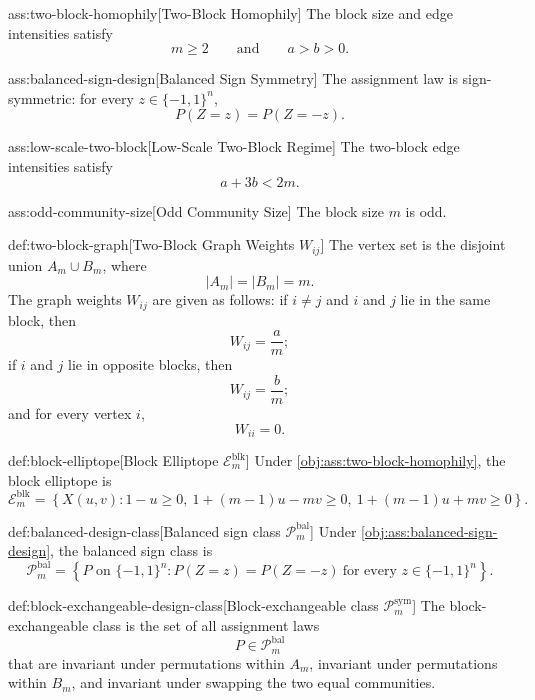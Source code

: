 \begin{assumptionv}{ass:two-block-homophily}[Two-Block Homophily]
The block size and edge intensities satisfy
\[
m\ge 2
\qquad\text{and}\qquad
a>b>0.
\]
\end{assumptionv}

\begin{assumptionv}{ass:balanced-sign-design}[Balanced Sign Symmetry]
The assignment law is sign-symmetric: for every \(z\in\{-1,1\}^n\),
\[
P(Z=z)=P(Z=-z).
\]
\end{assumptionv}

\begin{assumptionv}{ass:low-scale-two-block}[Low-Scale Two-Block Regime]
The two-block edge intensities satisfy
\[
a+3b<2m.
\]
\end{assumptionv}

\begin{assumptionv}{ass:odd-community-size}[Odd Community Size]
The block size \(m\) is odd.
\end{assumptionv}

\begin{definitionv}{def:two-block-graph}[Two-Block Graph Weights \(W_{ij}\)]
The vertex set is the disjoint union \(A_m\cup B_m\), where
\[
|A_m|=|B_m|=m.
\]
The graph weights \(W_{ij}\) are given as follows: if \(i\ne j\) and \(i\) and \(j\) lie in the same block, then
\[
W_{ij}=\frac{a}{m};
\]
if \(i\) and \(j\) lie in opposite blocks, then
\[
W_{ij}=\frac{b}{m};
\]
and for every vertex \(i\),
\[
W_{ii}=0.
\]
\end{definitionv}

\begin{definitionv}{def:block-elliptope}[Block Elliptope \(\mathcal E_m^{\mathrm{blk}}\)]
Under \cref{obj:ass:two-block-homophily}, the block elliptope is
\[
\mathcal E_m^{\mathrm{blk}}
=
\left\{
X(u,v):
1-u\ge 0,\ 
1+(m-1)u-mv\ge 0,\ 
1+(m-1)u+mv\ge 0
\right\}.
\]
\end{definitionv}

\begin{definitionv}{def:balanced-design-class}[Balanced sign class $\mathcal P_m^{\mathrm{bal}}$]
Under \cref{obj:ass:balanced-sign-design}, the balanced sign class is
\[
\mathcal P_m^{\mathrm{bal}}
=
\left\{
P \text{ on } \{-1,1\}^n :
P(Z=z)=P(Z=-z)\ \text{for every } z\in\{-1,1\}^n
\right\}.
\]
\end{definitionv}

\begin{definitionv}{def:block-exchangeable-design-class}[Block-exchangeable class $\mathcal P_m^{\mathrm{sym}}$]
The block-exchangeable class is the set of all assignment laws
\[
P\in \mathcal P_m^{\mathrm{bal}}
\]
that are invariant under permutations within $A_m$, invariant under permutations within $B_m$, and invariant under swapping the two equal communities.
\end{definitionv}

